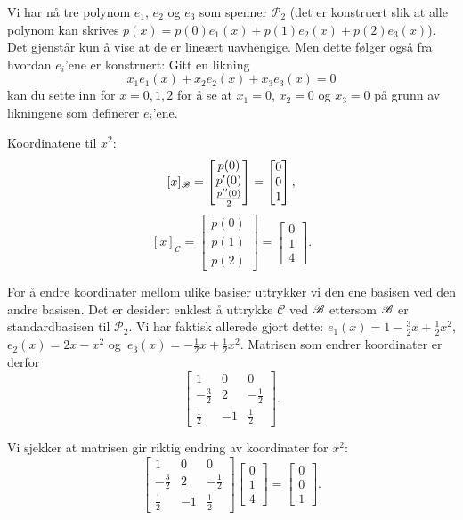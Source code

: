 \begin{losning}
\begin{punkt}
\noindent
Vi har nå tre polynom $e_1$, $e_2$ og $e_3$ som spenner $\mathcal{P}_2$ (det er konstruert slik at alle polynom kan skrives $p(x)=p(0)e_1(x)+p(1)e_2(x)+p(2)e_3(x)$). Det gjenstår kun å vise at de er lineært uavhengige. Men dette følger også fra hvordan $e_i$'ene er konstruert: Gitt en likning $$x_1e_1(x)+x_2e_2(x)+x_3e_3(x)=0$$ kan du sette inn for $x=0,1,2$ for å se at $x_1=0$, $x_2=0$ og $x_3=0$ på grunn av likningene som definerer $e_i$'ene.
\end{punkt}

\begin{punkt}
Koordinatene til $x^2$: $$[x]_{\mathscr{B}}=\begin{bmatrix}
p(0)\\
p'(0)\\
\frac{p''(0)}{2}
\end{bmatrix}=\begin{bmatrix}
0\\
0\\
1
\end{bmatrix},$$ $$[x]_{\mathscr{C}}=\begin{bmatrix}
p(0)\\
p(1)\\
p(2)
\end{bmatrix}=\begin{bmatrix}
0\\
1\\
4
\end{bmatrix}.$$
\end{punkt}

\begin{punkt}
For å endre koordinater mellom ulike basiser uttrykker vi den ene basisen ved den andre basisen. Det er desidert enklest å uttrykke $\mathscr{C}$ ved $\mathscr{B}$ ettersom $\mathscr{B}$ er standardbasisen til $\mathcal{P}_2$. Vi har faktisk allerede gjort dette: $e_1(x)=1-\frac{3}{2}x+\frac{1}{2}x^2$, $e_2(x)=2x-x^2$ og~$e_3(x)=-\frac{1}{2}x+\frac{1}{2}x^2$. Matrisen som endrer koordinater er derfor
$$
\begin{bmatrix}
1 & 0 & 0\\
-\frac{3}{2} & 2 & -\frac{1}{2}\\
\frac{1}{2} & -1 & \frac{1}{2}
\end{bmatrix}.$$

\noindent
Vi sjekker at matrisen gir riktig endring av koordinater for $x^2$:
$$
\begin{bmatrix}
1 & 0 & 0\\
-\frac{3}{2} & 2 & -\frac{1}{2}\\
\frac{1}{2} & -1 & \frac{1}{2}
\end{bmatrix}\begin{bmatrix}
0\\
1\\
4
\end{bmatrix}=\begin{bmatrix}
0\\
0\\
1
\end{bmatrix}.$$

\end{punkt}

\end{losning}



